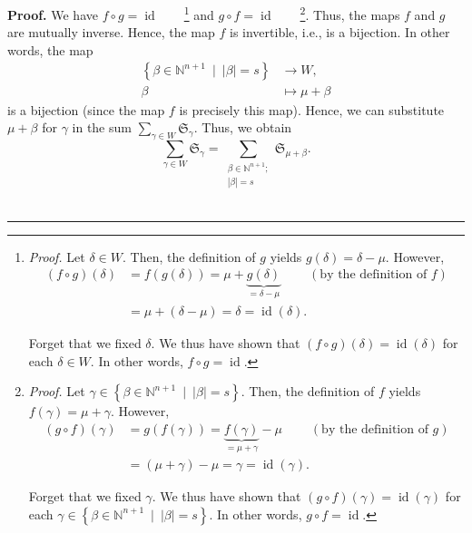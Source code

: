 \documentclass
[numbers=enddot,12pt,final,onecolumn,notitlepage,english]{scrartcl}%
\theoremstyle{definition}
\newenvironment{proof}[1][Proof]{\noindent\textbf{#1.} }{\ \rule{0.5em}{0.5em}}
\let\sumnonlimits\sum
\renewcommand{\sum}{\sumnonlimits\limits}
\newenvironment{verlong}{}{}
\begin{document}
\begin{proof}
\begin{verlong}
We have $f\circ g=\operatorname*{id}$\ \ \ \ \footnote{\textit{Proof.} Let
$\delta\in W$. Then, the definition of $g$ yields $g\left(  \delta\right)
=\delta-\mu$. However,%
\begin{align*}
\left(  f\circ g\right)  \left(  \delta\right)   &  =f\left(  g\left(
\delta\right)  \right)  =\mu+\underbrace{g\left(  \delta\right)  }%
_{=\delta-\mu}\ \ \ \ \ \ \ \ \ \ \left(  \text{by the definition of }f\right)
\\
&  =\mu+\left(  \delta-\mu\right)  =\delta=\operatorname*{id}\left(
\delta\right)  .
\end{align*}
\par
Forget that we fixed $\delta$. We thus have shown that $\left(  f\circ
g\right)  \left(  \delta\right)  =\operatorname*{id}\left(  \delta\right)  $
for each $\delta\in W$. In other words, $f\circ g=\operatorname*{id}$.} and
$g\circ f=\operatorname*{id}$\ \ \ \ \footnote{\textit{Proof.} Let $\gamma
\in\left\{  \beta\in\mathbb{N}^{n+1}\ \mid\ \left\vert \beta\right\vert
=s\right\}  $. Then, the definition of $f$ yields $f\left(  \gamma\right)
=\mu+\gamma$. However,%
\begin{align*}
\left(  g\circ f\right)  \left(  \gamma\right)   &  =g\left(  f\left(
\gamma\right)  \right)  =\underbrace{f\left(  \gamma\right)  }_{=\mu+\gamma
}-\mu\ \ \ \ \ \ \ \ \ \ \left(  \text{by the definition of }g\right) \\
&  =\left(  \mu+\gamma\right)  -\mu=\gamma=\operatorname*{id}\left(
\gamma\right)  .
\end{align*}
\par
Forget that we fixed $\gamma$. We thus have shown that $\left(  g\circ
f\right)  \left(  \gamma\right)  =\operatorname*{id}\left(  \gamma\right)  $
for each $\gamma\in\left\{  \beta\in\mathbb{N}^{n+1}\ \mid\ \left\vert
\beta\right\vert =s\right\}  $. In other words, $g\circ f=\operatorname*{id}%
$.}. Thus, the maps $f$ and $g$ are mutually inverse. Hence, the map $f$ is
invertible, i.e., is a bijection. In other words, the map%
\begin{align*}
\left\{  \beta\in\mathbb{N}^{n+1}\ \mid\ \left\vert \beta\right\vert
=s\right\}   &  \rightarrow W,\\
\beta &  \mapsto\mu+\beta
\end{align*}
is a bijection (since the map $f$ is precisely this map). Hence, we can
substitute $\mu+\beta$ for $\gamma$ in the sum $\sum_{\gamma\in W}%
\mathfrak{S}_{\gamma}$. Thus, we obtain%
\[
\sum_{\gamma\in W}\mathfrak{S}_{\gamma}=\sum_{\substack{\beta\in
\mathbb{N}^{n+1};\\\left\vert \beta\right\vert =s}}\mathfrak{S}_{\mu+\beta}.
\]
\end{verlong}
\end{proof}
\end{document}
